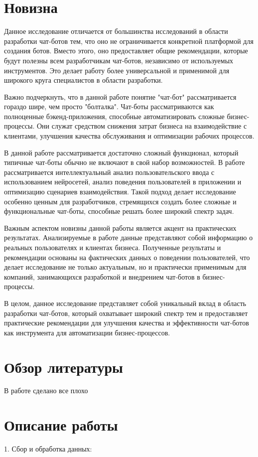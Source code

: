 \documentclass{article}
\begin{document}
\section{Новизна}
Данное исследование отличается от большинства исследований в области разработки чат-ботов тем, что оно не ограничивается конкретной платформой для создания ботов. Вместо этого, оно предоставляет общие рекомендации, которые будут полезны всем разработчикам чат-ботов, независимо от используемых инструментов. Это делает работу более универсальной и применимой для широкого круга специалистов в области разработки.

Важно подчеркнуть, что в данной работе понятие "чат-бот" рассматривается гораздо шире, чем просто "болталка". Чат-боты рассматриваются как полноценные бэкенд-приложения, способные автоматизировать сложные бизнес-процессы. Они служат средством снижения затрат бизнеса на взаимодействие с клиентами, улучшения качества обслуживания и оптимизации рабочих процессов.

В данной работе рассматривается достаточно сложный функционал, который типичные чат-боты обычно не включают в свой набор возможностей. В работе рассматривается интеллектуальный анализ пользовательского ввода с использованием нейросетей, анализ поведения пользователей в приложении и оптимизацию сценариев взаимодействия. Такой подход делает исследование особенно ценным для разработчиков, стремящихся создать более сложные и функциональные чат-боты, способные решать более широкий спектр задач.

Важным аспектом новизны данной работы является акцент на практических результатах. Анализируемые в работе данные представляют собой информацию о реальных пользователях и клиентах бизнеса. Полученные результаты и рекомендации основаны на фактических данных о поведении пользователей, что делает исследование не только актуальным, но и практически применимым для компаний, занимающихся разработкой и внедрением чат-ботов в бизнес-процессы.

В целом, данное исследование представляет собой уникальный вклад в область разработки чат-ботов, который охватывает широкий спектр тем и предоставляет практические рекомендации для улучшения качества и эффективности чат-ботов как инструмента для автоматизации бизнес-процессов.
\section{Обзор литературы}
В работе \cite{greenwade93} сделано все плохо
\section{Описание работы}
1. Сбор и обработка данных:
\end{document}

